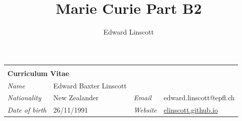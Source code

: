 \documentclass[10pt,a4paper,final]{article}
\author{Edward Linscott}
\title{Marie Curie Part B2}
\begin{document}
\begin{tabularx}{\textwidth}{
      m{}%
      m{}%
      m{}%
      m{}}
   \multicolumn{4}{l}{\cellcolor{seaborn_red}}                                                             \\[-1.5em]
   \multicolumn{4}{l}{\cellcolor{seaborn_red}%
      \Huge\textbf{\textcolor{seaborn_bg_grey_half}{Curriculum Vitae}%
      }}                                                                                                   \\
   \textit{Name         } & Edward Baxter Linscott &                  &                                    \\
   \textit{Nationality  } & New Zealander          & \textit{Email  } & edward.linscott@epfl.ch            \\
   \textit{Date of birth} & 26/11/1991             & \textit{Website} & \href{https://elinscott.github.io/}{elinscott.github.io} \\
\end{tabularx}


\setlength{\fboxsep}{5pt}%
\setlength{\fboxrule}{0pt}
\end{document}
